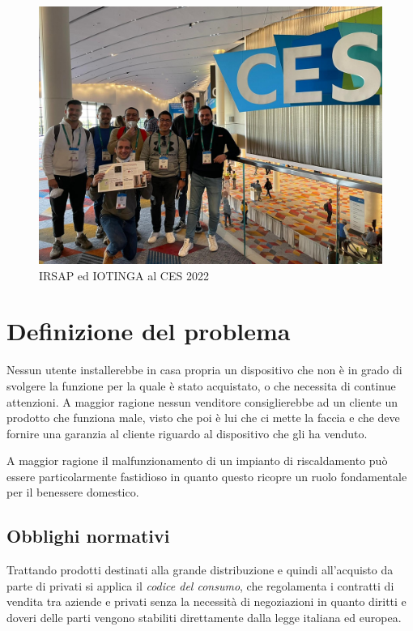 \documentclass[12pt,a4paper,twoside,titlepage]{book}
\begin{document}
\begin{figure}[ht]
    \centering
    \includegraphics[width=12cm]{img/ces.jpeg}
    \caption{IRSAP ed IOTINGA al CES 2022}
    \label{fig:ces}
\end{figure}


\chapter{Definizione del problema}

Nessun utente installerebbe in casa propria un dispositivo che non è in grado di svolgere la funzione 
per la quale è stato acquistato, o che necessita di continue attenzioni.
A maggior ragione nessun venditore consiglierebbe ad un cliente un prodotto che funziona male, 
visto che poi è lui che ci mette la faccia e che deve fornire una garanzia al cliente riguardo 
al dispositivo che gli ha venduto. 

A maggior ragione il malfunzionamento di un impianto di riscaldamento può essere particolarmente 
fastidioso in quanto questo ricopre un ruolo fondamentale per il benessere domestico.

\section{Obblighi normativi}

Trattando prodotti destinati alla grande distribuzione e quindi all'acquisto da parte 
di privati si applica il \textit{codice del consumo}, che regolamenta i contratti di vendita
tra aziende e privati senza la necessità di negoziazioni in quanto diritti e doveri delle parti 
vengono stabiliti direttamente dalla legge italiana ed europea.
\end{document}

